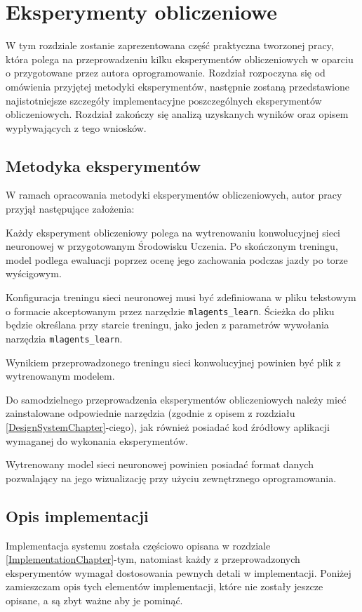 \chapter{Eksperymenty obliczeniowe}
\label{ExperimentsChapter}
\vspace*{-1cm}
W tym rozdziale zostanie zaprezentowana część praktyczna tworzonej pracy, która polega na przeprowadzeniu kilku eksperymentów obliczeniowych w oparciu o przygotowane przez autora oprogramowanie. Rozdział rozpoczyna się od omówienia przyjętej metodyki eksperymentów, następnie zostaną przedstawione najistotniejsze szczegóły implementacyjne poszczególnych eksperymentów obliczeniowych. Rozdział zakończy się analizą uzyskanych wyników oraz opisem wypływających z tego wniosków.

\section{Metodyka eksperymentów}
W ramach opracowania metodyki eksperymentów obliczeniowych, autor pracy przyjął następujące założenia:
\begin{enumerate*}
\item Każdy eksperyment obliczeniowy polega na wytrenowaniu konwolucyjnej sieci neuronowej w przygotowanym Środowisku Uczenia. Po skończonym treningu, model podlega ewaluacji poprzez ocenę jego zachowania podczas jazdy po torze wyścigowym.
\item Konfiguracja treningu sieci neuronowej musi być zdefiniowana w pliku tekstowym o formacie akceptowanym przez narzędzie \texttt{mlagents\_learn}. Ścieżka do pliku będzie określana przy starcie treningu, jako jeden z parametrów wywołania narzędzia \texttt{mlagents\_learn}.
\item Wynikiem przeprowadzonego treningu sieci konwolucyjnej powinien być plik z wytrenowanym modelem.
\item Do samodzielnego przeprowadzenia eksperymentów obliczeniowych należy mieć zainstalowane odpowiednie narzędzia (zgodnie z opisem z rozdziału \ref{DesignSystemChapter}-ciego), jak również posiadać kod źródłowy aplikacji wymaganej do wykonania eksperymentów.
\item Wytrenowany model sieci neuronowej powinien posiadać format danych pozwalający na jego wizualizację przy użyciu zewnętrznego oprogramowania.
\end{enumerate*}

\section{Opis implementacji}
Implementacja systemu została częściowo opisana w rozdziale \ref{ImplementationChapter}-tym, natomiast każdy z przeprowadzonych eksperymentów wymagał dostosowania pewnych detali w implementacji. Poniżej zamieszczam opis tych elementów implementacji, które nie zostały jeszcze opisane, a są zbyt ważne aby je pominąć.

